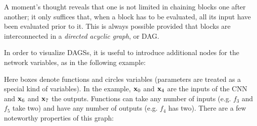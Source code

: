 A moment's thought reveals that one is not limited in chaining blocks one after another; it only suffices that, when a block has to be evaluated, all its input have been evaluated prior to it. This is always possible provided that blocks are interconnected in a \emph{directed acyclic graph}, or DAG.

In order to visualize DAGSs, it is useful to introduce additional nodes for the network variables,  as in the following example:
\begin{center}
\end{center}
Here boxes denote functions and circles variables (parameters are treated as a special kind of variables). In the example, $\mathbf{x}_0$ and $\mathbf{x}_4$ are the inputs of the CNN and $\mathbf{x}_6$ and $\mathbf{x}_7$ the outputs. Functions can take any number of inputs (e.g. $f_3$ and $f_5$ take two) and have any number of outputs (e.g. $f_4$ has two). There are a few noteworthy properties of this graph:

